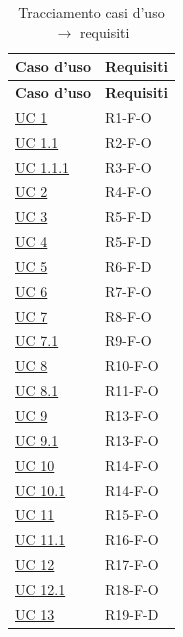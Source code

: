 {
    \small
    \renewcommand{\arraystretch}{1.3}
    \begin{longtable}{|>{\raggedright\arraybackslash}p{3.0cm}|>{\raggedright\arraybackslash}p{12.6cm}|}
    \caption{Tracciamento casi d'uso $\rightarrow$ requisiti}\label{tab:trac-uc-req}\\
    \hline
    \rowcolor[gray]{0.88} \textbf{Caso d'uso} & \textbf{Requisiti} \\ \hline
    \endfirsthead
    \hline
    \rowcolor[gray]{0.88} \textbf{Caso d'uso} & \textbf{Requisiti} \\ \hline
    \endhead

    \hyperref[uc:1]{UC 1} & \mbox{R1-F-O} \\ \hline
    \hyperref[uc:1.1]{UC 1.1} & \mbox{R2-F-O} \\ \hline
    \hyperref[uc:1.1.1]{UC 1.1.1} & \mbox{R3-F-O} \\ \hline
    \hyperref[uc:2]{UC 2} & \mbox{R4-F-O} \\ \hline
    \hyperref[uc:3]{UC 3} & \mbox{R5-F-D} \\ \hline
    \hyperref[uc:4]{UC 4} & \mbox{R5-F-D} \\ \hline
    \hyperref[uc:5]{UC 5} & \mbox{R6-F-D} \\ \hline
    \hyperref[uc:6]{UC 6} & \mbox{R7-F-O} \\ \hline
    \hyperref[uc:7]{UC 7} & \mbox{R8-F-O} \\ \hline
    \hyperref[uc:7.1]{UC 7.1} & \mbox{R9-F-O} \\ \hline
    \hyperref[uc:8]{UC 8} & \mbox{R10-F-O} \\ \hline
    \hyperref[uc:8.1]{UC 8.1} & \mbox{R11-F-O} \\ \hline
    \hyperref[uc:9]{UC 9} & \mbox{R13-F-O} \\ \hline
    \hyperref[uc:9.1]{UC 9.1} & \mbox{R13-F-O} \\ \hline
    \hyperref[uc:10]{UC 10} & \mbox{R14-F-O} \\ \hline
    \hyperref[uc:10.1]{UC 10.1} & \mbox{R14-F-O} \\ \hline
    \hyperref[uc:11]{UC 11} & \mbox{R15-F-O} \\ \hline
    \hyperref[uc:11.1]{UC 11.1} & \mbox{R16-F-O} \\ \hline
    \hyperref[uc:12]{UC 12} & \mbox{R17-F-O} \\ \hline
    \hyperref[uc:12.1]{UC 12.1} & \mbox{R18-F-O} \\ \hline
    \hyperref[uc:13]{UC 13} & \mbox{R19-F-D} \\ \hline

\end{longtable}}
